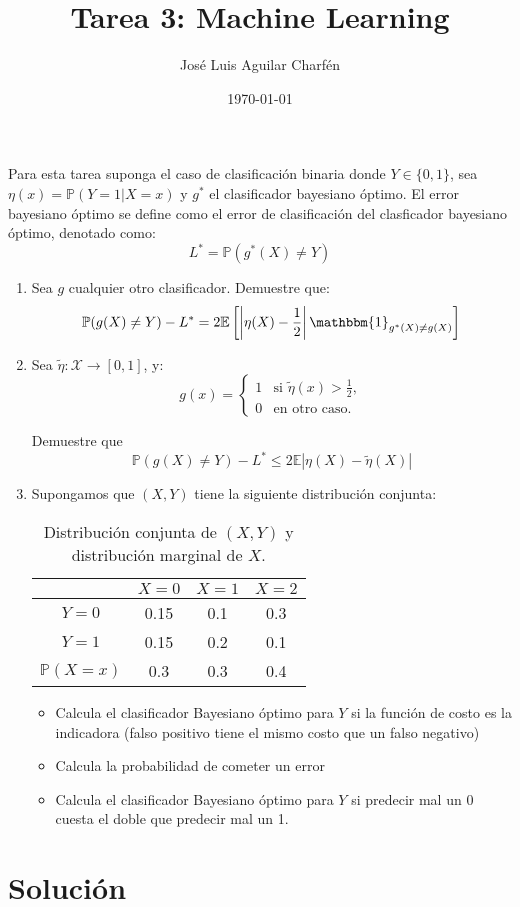 \documentclass{amsart}
\author{José Luis Aguilar Charfén}
\date{\today}
\title{Tarea 3: Machine Learning}
\renewcommand{\P}{\mathbb{P}}
\newcommand{\E}{\mathbb{E}}
\newcommand{\ind}[1][]{\mathbbm{1}_{#1}}
\begin{document}
    \maketitle
    Para esta tarea suponga el caso de clasificación binaria donde $Y \in \{0, 1\}$,
    sea $\eta(x) = \mathbb{P}(Y = 1|X = x)$ y $g^*$ el clasificador bayesiano 
    óptimo. El error bayesiano óptimo se define como el error de clasificación 
    del clasficador bayesiano óptimo, denotado como:
    $$L^*=\P(g^*(X)\ne Y)$$
    \begin{enumerate}
        \item Sea $g$ cualquier otro clasificador. Demuestre que: 
        $$\P(g(X)\ne Y)-L^* = 2\E\left[\left|\eta(X)-\frac{1}{2}\right|\ind[g^*(X)\ne g(X)]\right]$$
        \item Sea $\tilde{\eta}:\mathcal{X}\rightarrow [0,1]$, y:
        $$g(x) = \begin{cases}
            1 & \text{si }\tilde{\eta}(x) >\frac{1}{2}, \\
            0 & \text{en otro caso.}
        \end{cases}$$

        Demuestre que $$\P(g(X)\ne Y)-L^* \le 2\E\left|\eta(X)-\tilde{\eta}(X)\right|$$
        \item Supongamos que $(X,Y)$ tiene la siguiente distribución conjunta: 
        \begin{table}[!ht]
            \caption{Distribución conjunta de $(X,Y)$ y distribución marginal de $X$.}\label{tab:prob}
            \begin{tabular}{c | c c c}
                \hline
                        & $X=0$ & $X=1$ & $X=2$ \\\hline\hline
                $Y=0$   & 0.15  & 0.1   & 0.3   \\\hline
                $Y=1$   & 0.15  & 0.2   & 0.1   \\\hline
            $\P(X=x)$   & 0.3   & 0.3   & 0.4   \\\hline
            \end{tabular}   
        \end{table}
        \begin{itemize}
            \item Calcula el clasificador Bayesiano óptimo para $Y$ si la función 
            de costo es la indicadora (falso positivo tiene el mismo costo que un falso negativo)
            \item Calcula la probabilidad de cometer un error
            \item Calcula el clasificador Bayesiano óptimo para $Y$ si predecir 
            mal un 0 cuesta el doble que predecir mal un 1.
        \end{itemize}
    \end{enumerate}

    \section*{Solución}
    
    
    

    
\end{document}
